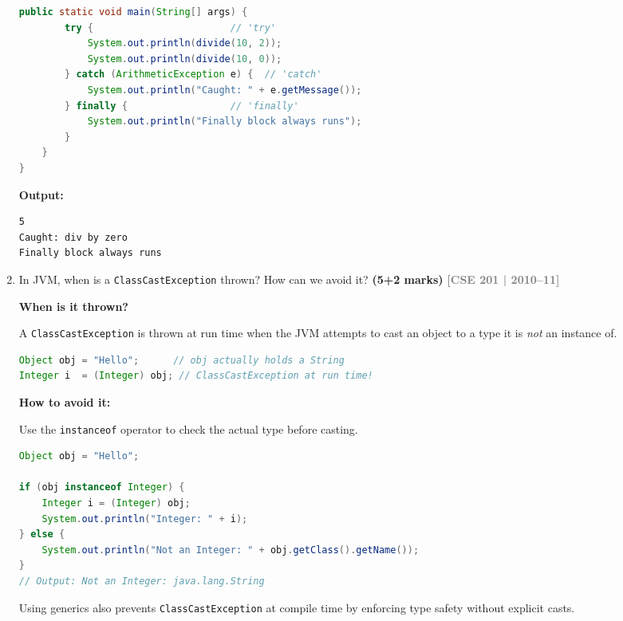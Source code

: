 \documentclass[12pt,a3paper]{article}
\newcommand{\yr}[1]{\hfill\textcolor{gray}{\small\textbf{[#1]}}}
\newcommand{\mk}[1]{\textcolor{orange!70!black}{\small\textbf{(#1 marks)}}}
\begin{document}
\begin{enumerate}
\begin{tcolorbox}[enhanced,breakable,ansbox,
  colback=cE!4,colframe=cE,boxrule=0.8pt,arc=5pt,
  title={\textbf{Answer --- Java Exception Handling Keywords}},
  fonttitle=\bfseries\color{white},colbacktitle=cE]
\begin{lstlisting}[language=Java]
    public static void main(String[] args) {
        try {                        // 'try'
            System.out.println(divide(10, 2));
            System.out.println(divide(10, 0));
        } catch (ArithmeticException e) {  // 'catch'
            System.out.println("Caught: " + e.getMessage());
        } finally {                  // 'finally'
            System.out.println("Finally block always runs");
        }
    }
}
\end{lstlisting}
\textbf{Output:}
\begin{verbatim}
5
Caught: div by zero
Finally block always runs
\end{verbatim}
\end{tcolorbox}



\item In JVM, when is a \texttt{ClassCastException} thrown? How can we avoid it? \mk{5+2}
\yr{CSE 201 | 2010--11}

\begin{tcolorbox}[enhanced,breakable,ansbox,
  colback=cE!4,colframe=cE,boxrule=0.8pt,arc=5pt,
  title={\textbf{Answer --- ClassCastException: When and How to Avoid}},
  fonttitle=\bfseries\color{white},colbacktitle=cE]

\textbf{When is it thrown?}

A \texttt{ClassCastException} is thrown at run time when the JVM
attempts to cast an object to a type it is \emph{not} an instance of.

\begin{lstlisting}[language=Java]
Object obj = "Hello";      // obj actually holds a String
Integer i  = (Integer) obj; // ClassCastException at run time!
\end{lstlisting}

\textbf{How to avoid it:}

Use the \texttt{instanceof} operator to check the actual type before
casting.

\begin{lstlisting}[language=Java]
Object obj = "Hello";

if (obj instanceof Integer) {
    Integer i = (Integer) obj;
    System.out.println("Integer: " + i);
} else {
    System.out.println("Not an Integer: " + obj.getClass().getName());
}
// Output: Not an Integer: java.lang.String
\end{lstlisting}

Using generics also prevents \texttt{ClassCastException} at compile
time by enforcing type safety without explicit casts.
\end{tcolorbox}




\end{enumerate}
\end{document}
